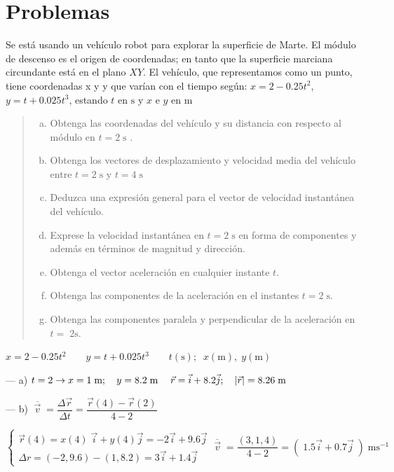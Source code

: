 \section{Problemas}

\begin{prob}
Se está usando un vehículo robot para explorar la superficie de Marte. El módulo de descenso es el origen de coordenadas; en tanto que la superficie marciana circundante está en el plano $XY$. El vehículo, que representamos como un punto, tiene coordenadas x y y que varían con el tiempo según: $x=2-0.25t^2$, $y=t+0.025t^3$, estando $t$ en $\mathrm{s}$ y $x$ e $y$ en $\mathrm{m}$ 
\begin{quote}
\begin{enumerate}[a) ]
\item Obtenga las coordenadas del vehículo y su distancia con respecto al módulo en $t=2\;\mathrm{s}$ . 
\item Obtenga los vectores de desplazamiento y velocidad media del vehículo entre $t=2\;\mathrm{s}$ y $t=4\;\mathrm{s}$
\item Deduzca una expresión general para el vector de velocidad instantánea del vehículo. 
\item Exprese la velocidad instantánea en $t=2\; \mathrm{s}$ en forma de componentes y además en términos de magnitud y dirección.  
\item Obtenga el vector aceleración en cualquier instante $t$.
\item Obtenga las componentes de la aceleración en el instantes $t=2\; \mathrm{s}$. 
\item Obtenga las componentes paralela y perpendicular de la aceleración en $t = \;2 \mathrm{s}$. 
\end{enumerate}
\end{quote}	
\end{prob}
 $x=2-0.25t^2\qquad y=t+0.025t^3 \qquad t(\mathrm{s});\;\; x(\mathrm{m}),\; y(\mathrm{m})$
 
 --- a) $t=2\to x=1\;\mathrm{m};\quad y=8.2\; \mathrm{m}\; \quad \vec r=\vec i+8.2\vec j; \quad \abs{\vec r}=8.26\; \mathrm{m}$
 
 --- b) $\displaystyle \overline{\;\vec v\; }=\dfrac{\Delta \vec r}{\Delta t}=\dfrac{\vec r(4)-\vec r(2)}{4-2}$
 
$ \begin{cases}
 \vec r(4)=x(4)\; \vec i+ y(4)\vec j=-2 \vec i +9.6 \vec j
 \\
 \Delta r=(-2,9.6)-(1,8.2)=3\vec i+1.4\vec j 
\end{cases}
\displaystyle \overline{\;\vec v\; }=\dfrac {(3,1,4)}{4-2}=(\;1.5\vec i+0.7\vec j\;)\; \mathrm{ms}^{-1}$

